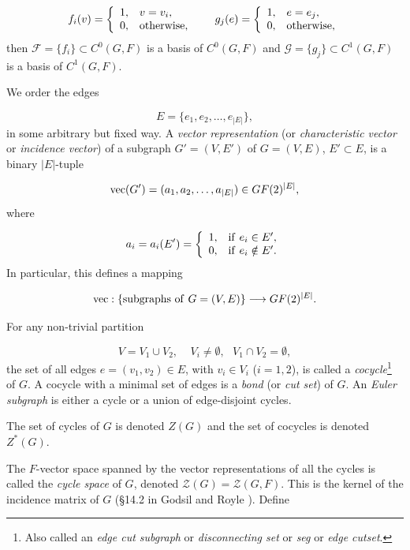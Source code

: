\[
f_i(v)=
\left\{
\begin{array}{ll}
1,& v = v_i,\\
0, & {\rm otherwise},
\end{array}
\right.
\ \ \ \ \ 
g_j(e)=
\left\{
\begin{array}{ll}
1,& e = e_j,\\
0, & {\rm otherwise},
\end{array}
\right.
\]
then ${\mathcal F}=\{f_i\}\subset C^0(G,F)$ is a basis
of $ C^0(G,F)$
and ${\mathcal G}=\{g_j\}\subset C^1(G,F)$ is a basis of $C^1(G,F)$.

We order the edges

\[
E = \{e_1,e_2,\dots, e_{|E|}\},
\]
in some arbitrary but fixed way.
A {\it vector representation} (or {\it characteristic vector} or
{\it incidence vector}) of a subgraph $G'=(V,E')$ of $G=(V,E)$,
$E'\subset E$, is a binary ${|E|}$-tuple

\[
{\rm vec}(G')=(a_1,a_2,\dots, a_{|E|}) \in GF(2)^{|E|},
\]
where 

\[
a_i=a_i(E')=
\left\{
\begin{array}{ll}
1,&{\rm if \ }e_i\in E',\\
0,&{\rm if \ }e_i\notin E'.
\end{array}
\right.
\]
In particular, this defines a mapping

\[
{\rm vec}:\{ {\rm subgraphs\ of\ }G=(V,E)\}\to GF(2)^{|E|}.
\]


For any non-trivial partition 

\[
V = V_1\cup V_2,\ \ \ \ \ V_i\not= \emptyset, \ \ \ V_1\cap V_2= \emptyset, 
\]
the set of all edges $e=(v_1,v_2)\in E$, with $v_i\in V_i$ ($i=1,2$),
is called a {\it cocycle}\footnote{Also called an {\it edge cut subgraph} 
or {\it disconnecting set} or
{\it seg} or {\it edge cutset}.} of $G$. 
A cocycle with a minimal set of edges is a  
{\it bond} (or {\it cut set}) of $G$.  
An {\it Euler subgraph} is either a cycle
or a union of edge-disjoint cycles.

The set of cycles of $G$ is denoted $Z(G)$ and the set of
cocycles is denoted $Z^*(G)$.

The $F$-vector space spanned by the vector representations of 
all the cycles is called the {\it cycle space} of $G$, denoted
${\mathcal Z}(G)={\mathcal Z}(G,F)$. 
This is the kernel of the incidence 
matrix of $G$ (\S 14.2 in Godsil and Royle \cite{GodsilRoyle2004}).
Define


